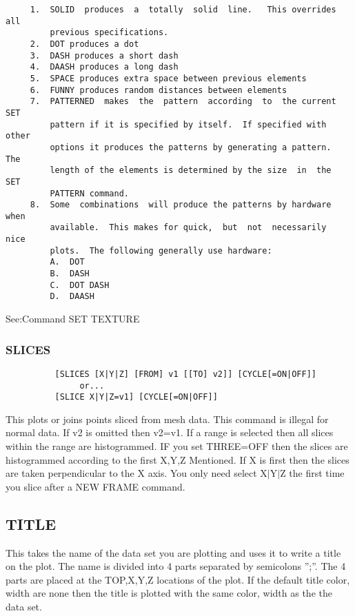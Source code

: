\begin{verbatim}
     1.  SOLID  produces  a  totally  solid  line.   This overrides all
         previous specifications.  
     2.  DOT produces a dot 
     3.  DASH produces a short dash 
     4.  DAASH produces a long dash 
     5.  SPACE produces extra space between previous elements 
     6.  FUNNY produces random distances between elements 
     7.  PATTERNED  makes  the  pattern  according  to  the current SET
         pattern if it is specified by itself.  If specified with other
         options it produces the patterns by generating a pattern.  The
         length of the elements is determined by the size  in  the  SET
         PATTERN command.  
     8.  Some  combinations  will produce the patterns by hardware when
         available.  This makes for quick,  but  not  necessarily  nice
         plots.  The following generally use hardware:  
         A.  DOT 
         B.  DASH 
         C.  DOT DASH 
         D.  DAASH 
\end{verbatim}

See:Command SET TEXTURE 
\subsubsection{SLICES}
\begin{verbatim}
          [SLICES [X|Y|Z] [FROM] v1 [[TO] v2]] [CYCLE[=ON|OFF]] 
               or...  
          [SLICE X|Y|Z=v1] [CYCLE[=ON|OFF]] 
\end{verbatim}

This  plots  or  joins  points  sliced from mesh data.  This command is
illegal for normal data.  If v2 is omitted then v2=v1.  If a  range  is
selected then all slices within the range are histogrammed.  IF you set
THREE=OFF then the slices are histogrammed according to the first X,Y,Z
Mentioned.   If  X  is first then the slices are taken perpendicular to
the X axis.  You only need select X$|$Y$|$Z the first time you slice  after
a NEW FRAME command.  
\subsection{TITLE}
This takes the name of the data set you are plotting and uses it to write
a title on the plot.  The name is  divided  into  4  parts  separated  by
semicolons '';''.  The 4 parts are placed at the TOP,X,Y,Z locations of the
plot.  If the default title color, width  are  none  then  the  title  is
plotted with the same color, width as the the data set.  

